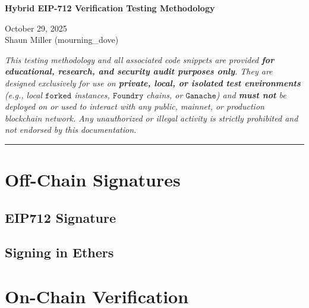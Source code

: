 \documentclass{article}
\begin{document}
\begin{minipage}{.90\textwidth}
    \begin{center}
    \Large
    \textbf{Hybrid EIP-712 Verification Testing Methodology}

    \vspace{0.5cm}

    \Large
    October 29, 2025\\
    Shaun Miller (mourning\_dove)
    \end{center}

    \vspace{1cm} 
   
\textit{
  This testing methodology and all associated code snippets are provided \textbf{for educational, research, and security audit purposes only}. 
  They are designed exclusively for use on \textbf{private, local, or isolated test environments} (e.g., local $\texttt{forked}$ instances, $\texttt{Foundry}$ chains, or $\texttt{Ganache}$) and \textbf{must not} be deployed on or used to interact with any public, mainnet, or production blockchain network. 
  Any unauthorized or illegal activity is strictly prohibited and not endorsed by this documentation.
}

\end{minipage}
 
\vspace{1cm} 




\vspace{0.7em}
\noindent\rule{\textwidth}{0.7pt}

\tableofcontents

\section{Off-Chain Signatures}
\label{sec:solidity-phase}
\subsection{EIP712 Signature}

\subsection{Signing in Ethers}

\section{On-Chain Verification}
\end{document}
